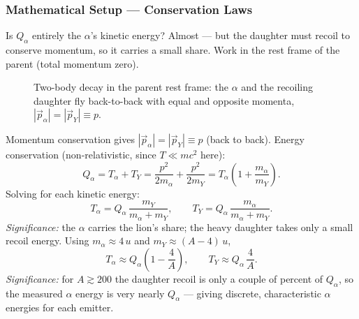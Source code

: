 \subsubsection*{Mathematical Setup --- Conservation Laws}
Is $Q_\alpha$ entirely the $\alpha$'s kinetic energy?  Almost --- but the
daughter must recoil to conserve momentum, so it carries a small share.  Work in
the rest frame of the parent (total momentum zero).

\begin{figure}[h]
\centering
{}
\caption{Two-body decay in the parent rest frame: the $\alpha$ and the recoiling
daughter fly back-to-back with equal and opposite momenta,
$|\vec p_\alpha| = |\vec p_Y| \equiv p$.}
\label{fig:lec08:recoil}
\end{figure}

Momentum conservation gives $|\vec p_\alpha| = |\vec p_Y| \equiv p$ (back to
back).  Energy conservation (non-relativistic, since $T \ll mc^2$ here):
\begin{equation}
  \label{eq:lec08:energy_cons}
  Q_\alpha = T_\alpha + T_Y
           = \frac{p^2}{2m_\alpha} + \frac{p^2}{2m_Y}
           = T_\alpha\left(1 + \frac{m_\alpha}{m_Y}\right).
\end{equation}
Solving for each kinetic energy:
\begin{equation}
  \label{eq:lec08:Talpha}
  \boxed{T_\alpha = Q_\alpha\,\frac{m_Y}{m_\alpha + m_Y},
         \qquad
         T_Y = Q_\alpha\,\frac{m_\alpha}{m_\alpha + m_Y}.}
\end{equation}
\textit{Significance:} the $\alpha$ carries the lion's share; the heavy daughter
takes only a small recoil energy.  Using $m_\alpha \approx 4\,u$ and
$m_Y \approx (A-4)\,u$,
\begin{equation}
  \label{eq:lec08:Talpha_approx}
  \boxed{T_\alpha \approx Q_\alpha\left(1 - \frac{4}{A}\right),
         \qquad
         T_Y \approx Q_\alpha\,\frac{4}{A}.}
\end{equation}
\textit{Significance:} for $A \gtrsim 200$ the daughter recoil is only a couple
of percent of $Q_\alpha$, so the measured $\alpha$ energy is very nearly
$Q_\alpha$ --- giving discrete, characteristic $\alpha$ energies for each emitter.


